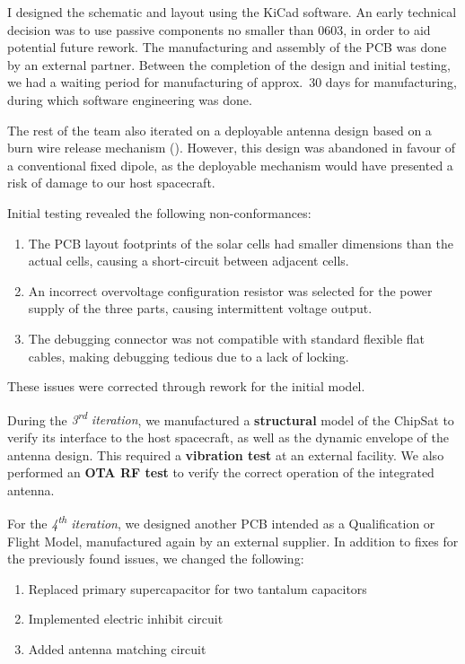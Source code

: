 \documentclass[a4paper,nobib,justified,final]{tufte-book}
\begin{document}
I designed the schematic and layout using the KiCad software. An early technical decision was to use passive components no smaller than 0603, in order to aid potential future rework. The manufacturing and assembly of the \acs{PCB} was done by an external partner. Between the completion of the design and initial testing, we had a waiting period for manufacturing of approx.\ 30 days for manufacturing, during which software engineering was done.
	
The rest of the team also iterated on a deployable antenna design based on a burn wire release mechanism (). However, this design was abandoned in favour of a conventional fixed dipole, as the deployable mechanism would have presented a risk of damage to our host spacecraft.
	
Initial testing revealed the following non-conformances:
\begin{enumerate}[itemsep=-2ex]
	\item The \ac{PCB} layout footprints of the solar cells had smaller dimensions than the actual cells, causing a short-circuit between adjacent cells.
	\item An incorrect overvoltage configuration resistor was selected for the power supply of the three parts, causing intermittent voltage output.
	\item The debugging connector was not compatible with standard flexible flat cables, making debugging tedious due to a lack of locking.
\end{enumerate}
These issues were corrected through rework for the initial model.

During the \emph{3\textsuperscript{rd} iteration}, we manufactured a \textbf{structural} model of the ChipSat to verify its interface to the host spacecraft, as well as the dynamic envelope of the antenna design. This required a \textbf{vibration test} at an external facility. We also performed an \textbf{\acf{OTA} \acs{RF} test} to verify the correct operation of the integrated antenna.

For the \emph{4\textsuperscript{th} iteration}, we designed another \ac{PCB} intended as a Qualification or Flight Model, manufactured again by an external supplier. In addition to fixes for the previously found issues, we changed the following:
\begin{enumerate}[itemsep=-2ex]
	\item Replaced primary supercapacitor for two tantalum capacitors
	\item Implemented electric inhibit circuit
	\item Added antenna matching circuit
\end{enumerate}
\end{document}
